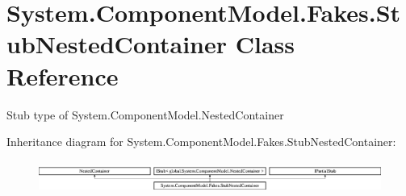 \hypertarget{class_system_1_1_component_model_1_1_fakes_1_1_stub_nested_container}{\section{System.\-Component\-Model.\-Fakes.\-Stub\-Nested\-Container Class Reference}
\label{class_system_1_1_component_model_1_1_fakes_1_1_stub_nested_container}
}


Stub type of System.\-Component\-Model.\-Nested\-Container 


Inheritance diagram for System.\-Component\-Model.\-Fakes.\-Stub\-Nested\-Container\-:\begin{figure}[H]
\begin{center}
\leavevmode
\includegraphics[height=1.066667cm]{class_system_1_1_component_model_1_1_fakes_1_1_stub_nested_container}
\end{center}
\end{figure}
